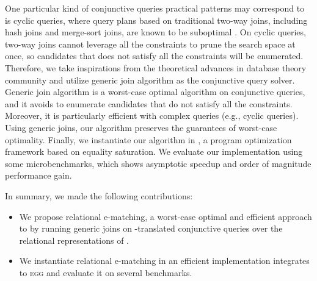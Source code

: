 One particular kind of conjunctive queries practical \ematching patterns may correspond to is cyclic queries, where query plans based on traditional two-way joins, including hash joins and merge-sort joins, are known to be suboptimal \citep{agm}.
On cyclic queries, two-way joins cannot leverage all the constraints to prune the search space at once, so candidates that does not satisfy all the constraints will be enumerated.
Therefore, we take inspirations from the theoretical advances in database theory community and utilize generic join algorithm as the conjunctive query solver. 
Generic join algorithm is a worst-case optimal algorithm on conjunctive queries, and it avoids to enumerate candidates that do not satisfy all the constraints.
Moreover, it is particularly efficient with complex queries (e.g., cyclic queries). 
Using generic joins, our \ematching algorithm preserves the guarantees of worst-case optimality. 
Finally, we instantiate our algorithm in \egg \citep{egg}, a program optimization framework based on equality saturation. We evaluate our implementation using some microbenchmarks, which shows asymptotic speedup and order of magnitude performance gain.

In summary, we made the following contributions:
\begin{itemize}
    \item We propose relational e-matching, a worst-case optimal and efficient approach to \ematching by running generic joins on \ematching-translated conjunctive queries over the relational representations of \egraphs.
    \item We instantiate relational e-matching in an efficient implementation integrates to \textsc{egg} and evaluate it on several benchmarks.
\end{itemize}


